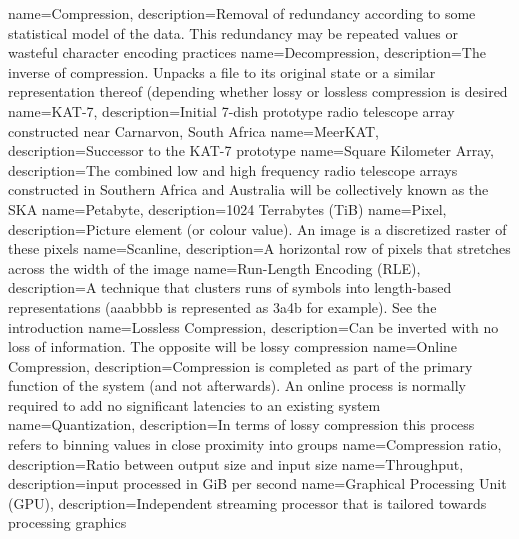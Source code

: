  {name={Compression},
  description={Removal of redundancy according to some statistical model of the data. This redundancy may be repeated values or wasteful character encoding practices}
 }
 {name={Decompression},
  description={The inverse of compression. Unpacks a file to its original state or a similar representation thereof (depending whether lossy or lossless compression is
  desired}
 }
 {name={KAT-7},
  description={Initial 7-dish prototype radio telescope array constructed near Carnarvon, South Africa}
 }
 {name={MeerKAT},
  description={Successor to the KAT-7 prototype}
 }
 {
  name={Square Kilometer Array},
  description={The combined low and high frequency radio telescope arrays constructed in Southern Africa and Australia will be collectively known as the SKA}
 }
 {
  name={Petabyte},
  description={1024 Terrabytes (TiB)}
 }
 {
  name={Pixel},
  description={Picture element (or colour value). An image is a discretized raster of these pixels}
 }
 {
  name={Scanline},
  description={A horizontal row of pixels that stretches across the width of the image}
 }
 {
  name={Run-Length Encoding (RLE)},
  description={A technique that clusters runs of symbols into length-based representations (aaabbbb is represented as 3a4b for example). See the introduction}
 }
 {
  name={Lossless Compression},
  description={Can be inverted with no loss of information. The opposite will be lossy compression}
 }
 {
  name={Online Compression},
  description={Compression is completed as part of the primary function of the system (and not afterwards). An online process is normally required to
  add no significant latencies to an existing system}
 }
 {
  name={Quantization},
  description={In terms of lossy compression this process refers to binning values in close proximity into groups}
 }
 {
  name={Compression ratio},
  description={Ratio between output size and input size}
 }
 {
  name={Throughput},
  description={input processed in GiB per second}
 }
 {
  name={Graphical Processing Unit (GPU)},
  description={Independent streaming processor that is tailored towards processing graphics}
 }
